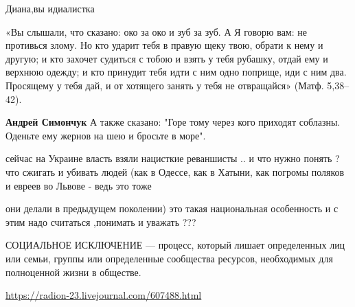 \begin{itemize}
Диана,вы идиалистка

 

«Вы слышали, что сказано: око за око и зуб за зуб. А Я говорю вам: не противься
злому. Но кто ударит тебя в правую щеку твою, обрати к нему и другую; и кто
захочет судиться с тобою и взять у тебя рубашку, отдай ему и верхнюю одежду; и
кто принудит тебя идти с ним одно поприще, иди с ним два. Просящему у тебя дай,
и от хотящего занять у тебя не отвращайся» (Матф. 5,38–42).


\begin{itemize}
 
\textbf{Андрей Симончук} А также сказано: "Горе тому через кого приходят соблазны. Оденьте ему жернов на шею и бросьте в море".
\end{itemize}

 

сейчас на Украине власть взяли нацисткие реваншисты .. и что нужно понять ? что
сжигать и убивать людей (как в Одессе, как в Хатыни, как погромы поляков и
евреев во Львове - ведь это тоже

они делали в предыдущем поколении) это такая национальная особенность и с этим
надо считаться ,понимать и уважать ???

 

СОЦИАЛЬНОЕ ИСКЛЮЧЕНИЕ — процесс, который лишает определенных лиц или семьи,
группы или определенные сообщества ресурсов, необходимых для полноценной жизни
в обществе.

\url{https://radion-23.livejournal.com/607488.html}


\end{itemize}
